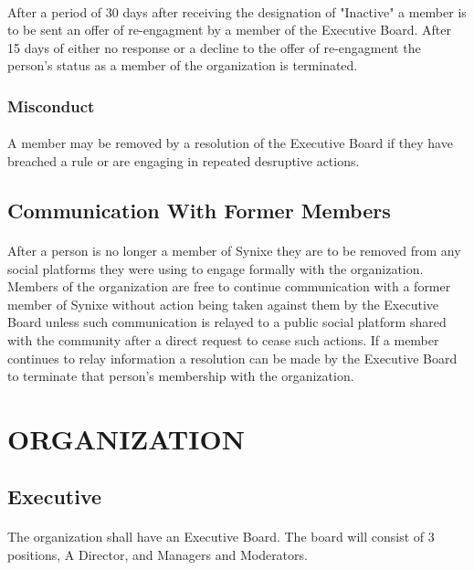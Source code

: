 \documentclass[10pt,a4paper]{article}
\begin{document}
\paragraph{}
After a period of 30 days after receiving the designation of "Inactive" a member is to be sent an offer of re-engagment by a member of the Executive Board. After 15 days of either no response or a decline to the offer of re-engagment the person's status as a member of the organization is terminated.
\subsubsection{Misconduct} \label{misconduct}
\paragraph{}
A member may be removed by a resolution of the Executive Board if they have breached a rule or are engaging in repeated desruptive actions.
\subsection{Communication With Former Members} \label{communication-former-members}
\paragraph{}
 After a person is no longer a member of Synixe they are to be removed from any social platforms they were using to engage formally with the organization. Members of the organization are free to continue communication with a former member of Synixe without action being taken against them by the Executive Board unless such communication is relayed to a public social platform shared with the community after a direct request to cease such actions. If a member continues to relay information a resolution can be made by the Executive Board to terminate that person's membership with the organization.
\section{ORGANIZATION}
\subsection{Executive}
\paragraph{}
The organization shall have an Executive Board. The board will consist of 3 positions, A Director, and Managers and Moderators.
\end{document}
